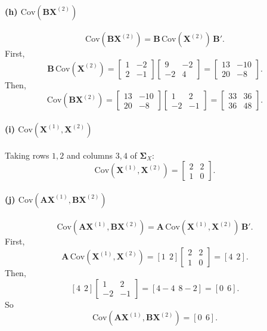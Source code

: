 \documentclass[11pt]{article}
\newcommand{\bA}{\mathbf{A}}
\newcommand{\bB}{\mathbf{B}}
\newcommand{\bX}{\mathbf{X}}
\newcommand{\bSigma}{\boldsymbol{\Sigma}}
\begin{document}
\paragraph{(h) $\mathrm{Cov}(\bB\bX^{(2)})$}
\[
\mathrm{Cov}(\bB\bX^{(2)}) = \bB\,\mathrm{Cov}(\bX^{(2)})\,\bB'.
\]
First,
\[
\bB\,\mathrm{Cov}(\bX^{(2)}) = \begin{bmatrix} 1 & -2 \\ 2 & -1 \end{bmatrix}\begin{bmatrix} 9 & -2 \\ -2 & 4 \end{bmatrix}
= \begin{bmatrix} 13 & -10 \\ 20 & -8 \end{bmatrix}.
\]
Then,
\[
\mathrm{Cov}(\bB\bX^{(2)}) = \begin{bmatrix} 13 & -10 \\ 20 & -8 \end{bmatrix}\begin{bmatrix} 1 & 2 \\ -2 & -1 \end{bmatrix}
= \begin{bmatrix} 33 & 36 \\ 36 & 48 \end{bmatrix}.
\]

\paragraph{(i) $\mathrm{Cov}(\bX^{(1)},\bX^{(2)})$}
Taking rows $1,2$ and columns $3,4$ of $\bSigma_X$:
\[
\mathrm{Cov}(\bX^{(1)},\bX^{(2)}) = \begin{bmatrix} 2 & 2 \\ 1 & 0 \end{bmatrix}.
\]

\paragraph{(j) $\mathrm{Cov}(\bA\bX^{(1)},\bB\bX^{(2)})$}
\[
\mathrm{Cov}(\bA\bX^{(1)},\bB\bX^{(2)}) = \bA\,\mathrm{Cov}(\bX^{(1)},\bX^{(2)})\,\bB'.
\]
First,
\[
\bA\,\mathrm{Cov}(\bX^{(1)},\bX^{(2)}) = [1\ \ 2]\begin{bmatrix} 2 & 2 \\ 1 & 0 \end{bmatrix} = [4\ \ 2].
\]
Then,
\[
[4\ \ 2]\begin{bmatrix} 1 & 2 \\ -2 & -1 \end{bmatrix} = [4-4 \ \ 8-2] = [0 \ \ 6].
\]
So
\[
\mathrm{Cov}(\bA\bX^{(1)},\bB\bX^{(2)}) = [0\ \ 6].
\]
\end{document}
